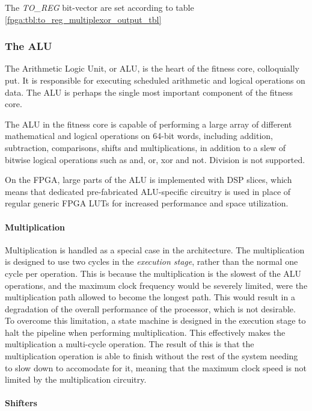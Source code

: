 The \emph{TO\_REG} bit-vector are set according to table \ref{fpga:tbl:to_reg_multiplexor_output_tbl}




\subsubsection{The ALU}

The Arithmetic Logic Unit, or ALU, is the heart of the fitness core, colloquially put.
It is responsible for executing scheduled arithmetic and logical operations on data.
The ALU is perhaps the single most important component of the fitness core.

The ALU in the fitness core is capable of performing a large array of different mathematical and logical operations on 64-bit words, including addition, subtraction, comparisons, shifts and multiplications, in addition to a slew of bitwise logical operations such as and, or, xor and not.
Division is not supported.

On the FPGA, large parts of the ALU is implemented with \glspl{DSP slice}, which means that dedicated pre-fabricated ALU-specific circuitry is used in place of regular generic \gls{FPGA} \glspl{LUT} for increased performance and space utilization.

\paragraph{Multiplication}

Multiplication is handled as a special case in the architecture.
The multiplication is designed to use two cycles in the \emph{execution stage}, rather than the normal one cycle per operation.
This is because the multiplication is the slowest of the ALU operations, and the maximum clock frequency would be severely limited, were the multiplication path allowed to become the longest path.
This would result in a degradation of the overall performance of the processor, which is not desirable.
To overcome this limitation, a state machine is designed in the execution stage to halt the pipeline when performing multiplication.
This effectively makes the multiplication a multi-cycle operation.
The result of this is that the multiplication operation is able to finish without the rest of the system needing to slow down to accomodate for it, meaning that the maximum clock speed is not limited by the multiplication circuitry.

\paragraph{Shifters}

